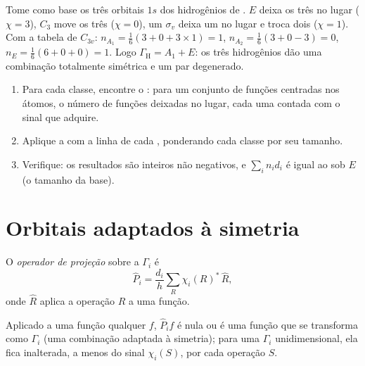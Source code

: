 \begin{example}\label{ex:b3:group-theory-applied:nh3}
Tome como base os três orbitais $1s$ dos hidrogênios de . $E$
deixa os três no lugar ($\chi = 3$), $C_3$ move os três ($\chi = 0$), um
$\sigma_v$ deixa um no lugar e troca dois ($\chi = 1$). Com a tabela de $C_{3v}$:
$n_{A_1} = \frac16(3 + 0 + 3\times1) = 1$, $n_{A_2} = \frac16(3 + 0 - 3) = 0$,
$n_E = \frac16(6 + 0 + 0) = 1$. Logo $\Gamma_{\mathrm H} = A_1 + E$: os três
hidrogênios dão uma combinação totalmente simétrica e um par degenerado.
\end{example}

\begin{method}\label{met:b3:group-theory-applied:reduce}
\begin{enumerate}
  \item Para cada classe, encontre o : para um conjunto de funções
        centradas nos átomos, o número de funções deixadas no lugar, cada uma
        contada com o sinal que adquire.
  \item Aplique a  com a linha de cada , ponderando cada classe por seu tamanho.
  \item Verifique: os resultados são inteiros não negativos, e $\sum_in_id_i$
        é igual ao  sob $E$ (o tamanho da base).
\end{enumerate}
\end{method}

\section{Orbitais adaptados à simetria}

\begin{definition}\label{def:b3:group-theory-applied:projection}
O \emph{operador de projeção} sobre a
 $\Gamma_i$ é
\[
\hat P_i = \frac{d_i}{h}\sum_R\chi_i(R)^*\,\hat R,
\]
onde $\hat R$ aplica a operação $R$ a uma função.
\end{definition}

\begin{proposition}\label{prop:b3:group-theory-applied:projection}
Aplicado a uma função qualquer $f$, $\hat P_if$ é nula ou é uma função que
se transforma como $\Gamma_i$ (uma combinação adaptada à simetria); para uma
$\Gamma_i$ unidimensional, ela fica inalterada, a menos do sinal $\chi_i(S)$, por
cada operação $S$.
\end{proposition}

